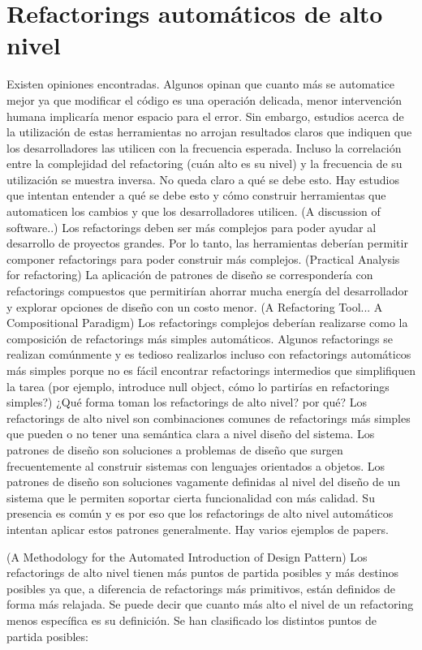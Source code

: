 \section{Refactorings automáticos de alto nivel}
Existen opiniones encontradas. Algunos opinan que cuanto más se automatice mejor ya que modificar el
código es una operación delicada, menor intervención humana implicaría menor espacio para el error.
Sin embargo, estudios acerca de la utilización de estas herramientas no arrojan resultados claros
que indiquen que los desarrolladores las utilicen con la frecuencia esperada. Incluso la correlación
entre la complejidad del refactoring (cuán alto es su nivel) y la frecuencia de su utilización se
muestra inversa. No queda claro a qué se debe esto. Hay estudios que intentan entender a qué se debe
esto y cómo construir herramientas que automaticen los cambios y que los desarrolladores utilicen.
(A discussion of software..) Los refactorings deben ser más complejos para poder ayudar al
desarrollo de proyectos grandes. Por lo tanto, las herramientas deberían permitir componer
refactorings para poder construir más complejos.
(Practical Analysis for refactoring) La aplicación de patrones de diseño se correspondería con
refactorings compuestos que permitirían ahorrar mucha energía del desarrollador y explorar opciones
de diseño con un costo menor.
(A Refactoring Tool... A Compositional Paradigm) Los refactorings complejos deberían realizarse como
la composición de refactorings más simples automáticos. Algunos refactorings se realizan comúnmente
y es tedioso realizarlos incluso con refactorings automáticos más simples porque no es fácil
encontrar refactorings intermedios que simplifiquen la tarea (por ejemplo, introduce null object,
cómo lo partirías en refactorings simples?)
¿Qué forma toman los refactorings de alto nivel? por qué? Los refactorings de alto nivel son
combinaciones comunes de refactorings más simples que pueden o no tener una semántica clara a nivel
diseño del sistema. Los patrones de diseño son soluciones a problemas de diseño que surgen
frecuentemente al construir sistemas con lenguajes orientados a objetos. Los patrones de diseño son
soluciones vagamente definidas al nivel del diseño de un sistema que le permiten soportar cierta
funcionalidad con más calidad. Su presencia es común y es por eso que los refactorings de alto nivel
automáticos intentan aplicar estos patrones generalmente. Hay varios ejemplos de papers.

(A Methodology for the Automated Introduction of Design Pattern) Los refactorings de alto nivel
tienen más puntos de partida posibles y más destinos posibles ya que, a diferencia de refactorings
más primitivos, están definidos de forma más relajada. Se puede decir que cuanto más alto el nivel
de un refactoring menos específica es su definición. Se han clasificado los distintos puntos de
partida posibles: 


